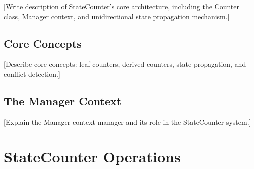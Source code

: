 \documentclass[11pt]{article}
\begin{document}
%

[Write description of StateCounter's core architecture, including the Counter class,
Manager context, and unidirectional state propagation mechanism.]

\subsection{Core Concepts}
\label{subsec:statecounter-concepts}

%

[Describe core concepts: leaf counters, derived counters, state propagation,
and conflict detection.]

\subsection{The Manager Context}
\label{subsec:manager}

%

[Explain the Manager context manager and its role in the StateCounter system.]



\section{StateCounter Operations}
\label{sec:statecounter-operations}

%
\end{document}
